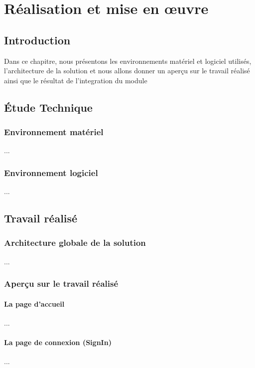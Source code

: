 \chapter{Réalisation et mise en œuvre}

\section*{Introduction}
Dans ce chapitre, nous présentons les environnements matériel et logiciel utilisés,
l’architecture de la solution et nous allons donner un aperçu sur le travail réalisé ainsi
que le résultat de l'integration du module 

\section{Étude Technique}

    \subsection{Environnement matériel}
    ...

    \subsection{Environnement logiciel}
    ...

\section{Travail réalisé}

    \subsection{Architecture globale de la solution}
    ...

    \subsection{Aperçu sur le travail réalisé}

        \subsubsection{La page d'accueil}
        ...

        \subsubsection{La page de connexion (SignIn)}
        ...

